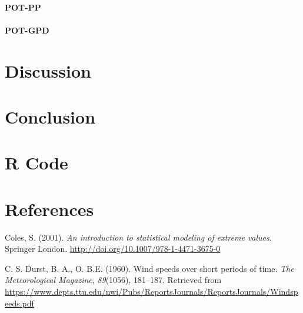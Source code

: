 \documentclass[12pt,oneside]{reedthesis}
\begin{document}
\hypertarget{pot-pp-4}{%
\subsubsection{POT-PP}\label{pot-pp-4}}

\hypertarget{pot-gpd-4}{%
\subsubsection{POT-GPD}\label{pot-gpd-4}}

\hypertarget{rmd-discussion}{%
\chapter{Discussion}\label{rmd-discussion}}

\hypertarget{conclusion}{%
\chapter*{Conclusion}\label{conclusion}}

\appendix

\hypertarget{r-code}{%
\chapter{R Code}\label{r-code}}

\backmatter

\hypertarget{references}{%
\chapter*{References}\label{references}}


\noindent

\setlength{\parindent}{-0.20in}
\setlength{\leftskip}{0.20in}
\setlength{\parskip}{8pt}

\hypertarget{refs}{}
\leavevmode\hypertarget{ref-Coles2001}{}%
Coles, S. (2001). \emph{An introduction to statistical modeling of extreme values}. Springer London. \url{http://doi.org/10.1007/978-1-4471-3675-0}

\leavevmode\hypertarget{ref-Durst1960}{}%
C. S. Durst, B. A., O. B.E. (1960). Wind speeds over short periods of time. \emph{The Meteorological Magazine}, \emph{89}(1056), 181--187. Retrieved from \url{https://www.depts.ttu.edu/nwi/Pubs/ReportsJournals/ReportsJournals/Windspeeds.pdf}
\end{document}
